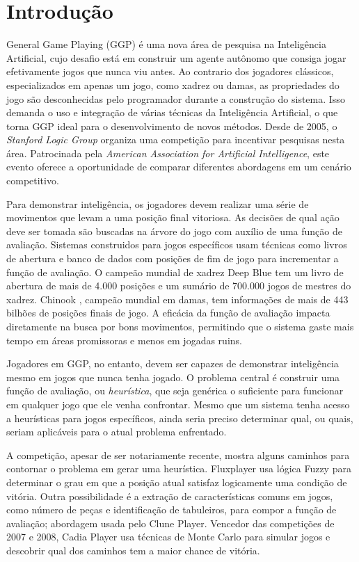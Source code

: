 \chapter{Introdução}
\label{intro}

General Game Playing (GGP) é uma nova área de pesquisa na Inteligência Artificial, cujo desafio está em construir um agente autônomo que consiga jogar efetivamente jogos que nunca viu antes. Ao contrario dos jogadores clássicos, especializados em apenas um jogo, como xadrez ou damas, as propriedades do jogo são desconhecidas pelo programador durante a construção do sistema. Isso demanda o uso e integração de várias técnicas da Inteligência Artificial, o que torna GGP ideal para o desenvolvimento de novos métodos. Desde de 2005, o \textit{Stanford Logic Group} organiza uma competição para incentivar pesquisas nesta área. Patrocinada pela \textit{American Association for Artificial Intelligence}, este evento oferece a oportunidade de comparar diferentes abordagens em um cenário competitivo.  

Para demonstrar inteligência, os jogadores devem realizar uma série de movimentos que levam a uma posição final vitoriosa. As decisões de qual ação deve ser tomada são buscadas na árvore do jogo com auxílio de uma função de avaliação. Sistemas construidos para jogos específicos usam técnicas como livros de abertura e banco de dados com posições de fim de jogo para incrementar a função de avaliação. O campeão mundial de xadrez Deep Blue \cite{dblue} tem um livro de abertura de mais de 4.000 posições e um sumário de 700.000 jogos de mestres do xadrez. 
Chinook \cite{chinook}, campeão mundial em damas, tem informações de mais de 443 bilhões de posições finais de jogo. A eficácia da função de avaliação impacta diretamente na busca por bons movimentos, permitindo que o sistema gaste mais tempo em áreas promissoras e menos em jogadas ruins.

Jogadores em GGP, no entanto, devem ser capazes de demonstrar inteligência mesmo em jogos que nunca tenha jogado. O problema central é construir uma função de avaliação, ou \textit{heurística}, que seja genérica o suficiente para funcionar em qualquer jogo que ele venha confrontar. Mesmo que um sistema tenha acesso a heurísticas para jogos específicos, ainda seria preciso determinar qual, ou quais, seriam aplicáveis para o atual problema enfrentado.

A competição, apesar de ser notariamente recente, mostra alguns caminhos para contornar o problema em gerar uma heurística. Fluxplayer\cite{flux} usa lógica Fuzzy para determinar o grau em que a posição atual satisfaz logicamente uma condição de vitória. Outra possibilidade é a extração de características comuns em jogos, como número de peças e identificação de tabuleiros, para compor a função de avaliação; abordagem usada pelo Clune Player\cite{clune}. Vencedor das competições de 2007 e 2008, Cadia Player\cite{cadia} usa técnicas de Monte Carlo para simular jogos e descobrir qual dos caminhos tem a maior chance de vitória.

